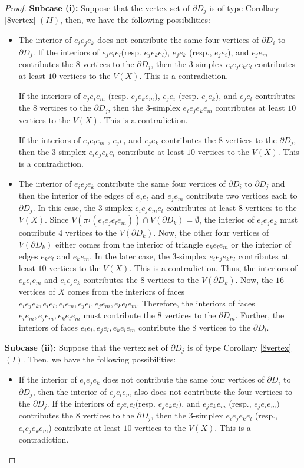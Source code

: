 \documentclass[11pt]{amsart}
\numberwithin{equation}{section}
\theoremstyle{definition}
\begin{document}
\begin{proof}
\textbf{Subcase (i):} Suppose that the vertex set of $\partial D_j$ is of type Corollary \ref{8vertex} $(II)$, then, we have the following possibilities:
\begin{itemize}
\item The interior of $e_ie_je_k$  does not contribute the same four vertices of $\partial D_i$ to $\partial D_j$. If the interiors of $e_je_ie_l$(resp. $e_je_ke_l)$, $e_je_k$ (resp., $e_je_i$), and $e_je_m$ contributes the $8$ vertices to the $\partial D_j$, then the $3$-simplex $e_ie_je_ke_l$ contributes at least $10$ vertices to the $V(X)$. This is a contradiction. 

If the interiors of $e_je_ie_m$ (resp. $e_je_ke_m)$, $e_je_i$ (resp. $e_je_k$), and $e_je_l$ contributes the $8$ vertices to the $\partial D_j$, then the $3$-simplex $e_ie_je_ke_m$ contributes at least $10$ vertices to the $V(X)$. This is a contradiction.

If the interiors of $e_je_le_m$ , $e_je_i$  and $e_je_k$ contributes the $8$ vertices to the $\partial D_j$, then the $3$-simplex $e_ie_je_ke_l$ contribute at least $10$ vertices to the $V(X)$. This is a contradiction.

    \item The interior of $e_ie_je_k$ contribute the same four vertices of $\partial D_i$ to $\partial D_j$ and then the interior of the edges of $e_je_l$ and $e_je_m$ contribute two vertices each to $\partial D_j$. In this case, the $3$-simplex $e_ie_je_me_l$ contributes at least $8$ vertices to the $V(X)$. Since $V(\pi^{_1}(e_ie_je_le_m))\cap V(\partial D_k)=\emptyset$, the interior of $e_ie_je_k$ must contribute $4$ vertices to the $V(\partial D_k)$. Now, the other four vertices of $V(\partial D_k)$ either comes from the interior of triangle $e_ke_le_m$ or the interior of edges $e_ke_l$ and $e_ke_m$. In the later case, the $3$-simplex $e_ie_je_ke_l$ contributes at least $10$ vertices to the $V(X)$. This is a contradiction. Thus, the interiors of  $e_ke_le_m$ and $e_ie_je_k$ contributes the $8$ vertices to the $V(\partial D_k)$. 
    Now, the $16$ vertices of $X$ comes from the interiors of faces $e_ie_je_k, e_ie_l,e_ie_m, e_je_l,e_je_m, e_ke_le_m$. Therefore, the interiors of faces  $e_ie_m, e_je_m, e_ke_le_m$ must contribute the $8$ vertices to the $\partial D_m$. Further, the interiors of faces  $e_ie_l, e_je_l, e_ke_le_m$  contribute the $8$ vertices to the $\partial D_l$. 
\end{itemize}

\textbf{Subcase (ii):} Suppose that the vertex set of $\partial D_j$ is of type Corollary \ref{8vertex} $(I)$. Then, we have the following possibilities:
\begin{itemize}
\item  If the interior of $e_ie_je_k$  does not contribute the same four vertices of $\partial D_i$ to $\partial D_j$, then the interior of $e_je_le_m$ also does not contribute the four vertices to the $\partial D_j$. If the interiors of $e_je_ie_l$(resp. $e_je_ke_l)$, and $e_je_ke_m$ (resp., $e_je_ie_m)$ contributes the $8$ vertices to the $\partial D_j$, then the $3$-simplex $e_ie_je_ke_l$ (resp., $e_ie_je_ke_m$) contribute at least $10$ vertices to the $V(X)$. This is a contradiction. 


\end{itemize}
\end{proof}
\end{document}
